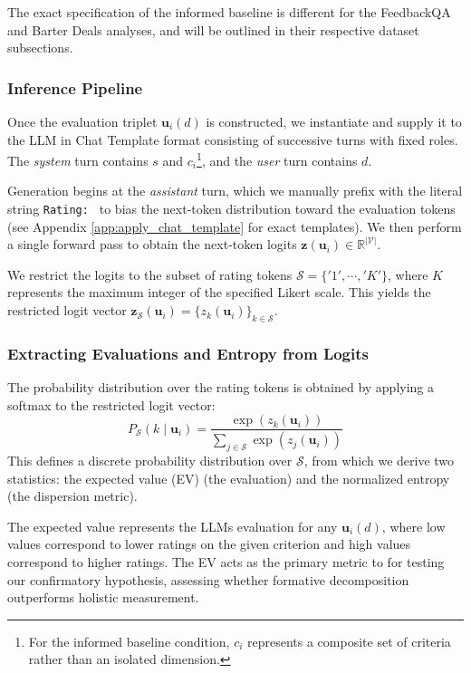The exact specification of the informed baseline is different for the FeedbackQA and Barter Deals analyses, and will be outlined in their respective dataset subsections. 

\subsubsection{Inference Pipeline}

Once the evaluation triplet $\mathbf{u}_i(d)$ is constructed, we instantiate and supply it to the LLM in Chat Template format consisting of successive turns with fixed roles. The \emph{system} turn contains $s$ and $c_i$\footnote{For the informed baseline condition, $c_i$ represents a composite set of criteria rather than an isolated dimension.}, and the \emph{user} turn contains $d$. 

Generation begins at the \emph{assistant} turn, which we manually prefix with the literal string \texttt{Rating: } to bias the next-token distribution toward the evaluation tokens (see Appendix \ref{app:apply_chat_template} for exact templates). We then perform a single forward pass to obtain the next-token logits $\mathbf{z}(\mathbf{u}_i) \in \mathbb{R}^{|\mathcal{V}|}$. 

We restrict the logits to the subset of rating tokens $\mathcal{S} = \{'1', \cdots, 'K'\}$, where $K$ represents the maximum integer of the specified Likert scale. This yields the restricted logit vector $\mathbf{z}_{\mathcal{S}}(\mathbf{u}_i) = \{z_k(\mathbf{u}_i)\}_{k \in \mathcal{S}}$.

\subsubsection{Extracting Evaluations and Entropy from Logits}

The probability distribution over the rating tokens is obtained by applying a softmax to the restricted logit vector:
\begin{equation}
P_{\mathcal{S}}(k \mid \mathbf{u}_i) = \frac{\exp(z_k(\mathbf{u}_i))}{\sum_{j \in \mathcal{S}} \exp(z_j(\mathbf{u}_i))}
\end{equation}
This defines a discrete probability distribution over $\mathcal{S}$, from which we derive two statistics: the expected value (EV) (the evaluation) and the normalized entropy (the dispersion metric).  

The expected value represents the LLMs evaluation for any $\mathbf{u}_i(d)$, where low values correspond to lower ratings on the given criterion and high values correspond to higher ratings. The EV acts as the primary metric to for testing our confirmatory hypothesis, assessing whether formative decomposition outperforms holistic measurement.

